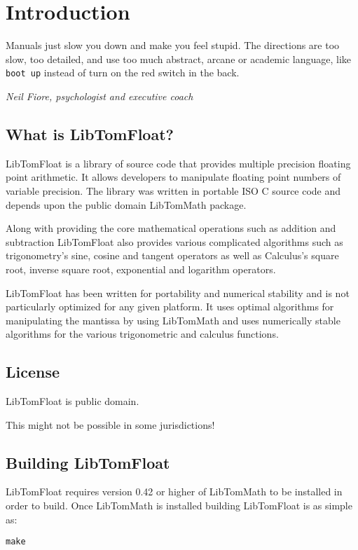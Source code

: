 \documentclass[a4paper]{book}
\theoremstyle{definition}
\theoremstyle{remark}
\begin{document}
\chapter{Introduction}

\epigraph{Manuals just slow you down and make you feel stupid. The directions are too slow, too detailed, and use too much abstract, arcane or academic language, like {\texttt {boot up}} instead of turn on the red switch in the back.}{\textit{ Neil Fiore, psychologist and executive coach }}

\section{What is LibTomFloat?}
LibTomFloat is a library of source code that provides multiple precision floating point arithmetic.  It allows developers to manipulate floating point numbers of variable precision.  The library was written in portable ISO C source code and depends upon the public domain LibTomMath package.

Along with providing the core mathematical operations such as addition and subtraction LibTomFloat also provides various complicated algorithms such as trigonometry's sine, cosine and tangent operators as well as Calculus's square root, inverse square root, exponential and logarithm
operators.

LibTomFloat has been written for portability and numerical stability and is not particularly optimized for any given platform. It uses optimal algorithms for manipulating the mantissa by using LibTomMath and uses numerically stable algorithms for the various trigonometric and calculus functions.

\section{License}
LibTomFloat is public domain.

This might not be possible in some jurisdictions!

\section{Building LibTomFloat}
LibTomFloat requires version 0.42 or higher of LibTomMath to be installed in order to build.  Once LibTomMath is installed building LibTomFloat is as simple as:

\begin{alltt}
make
\end{alltt}
\end{document}
